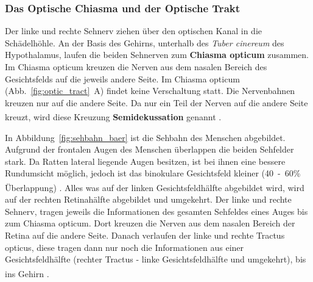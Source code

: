 \documentclass[12pt,a4paper,pdftex]{article}
\begin{document}
\subsubsection*{Das Optische Chiasma und der Optische Trakt}

Der linke und rechte Sehnerv ziehen über den optischen Kanal in die Schädelhöhle. An der Basis des Gehirns, unterhalb des \textit{Tuber cinereum} des Hypothalamus, laufen die beiden Sehnerven zum \textbf{Chiasma opticum}  zusammen. 
Im Chiasma opticum kreuzen die Nerven aus dem nasalen Bereich des Gesichtsfelds auf die jeweils andere Seite. Im Chiasma opticum (Abb.~\ref{fig:optic_tract}~A) findet keine Verschaltung statt. Die Nervenbahnen kreuzen nur auf die andere Seite.
Da nur ein Teil der Nerven auf die andere Seite kreuzt, wird diese Kreuzung \textbf{Semidekussation}  genannt \textsuperscript{\cite[15]{crossman2014neuroanatomy}}. 

In Abbildung~\ref{fig:sehbahn_baer} ist die Sehbahn des Menschen abgebildet. Aufgrund der frontalen Augen des Menschen überlappen die beiden Sehfelder stark. Da Ratten lateral liegende Augen besitzen, ist bei ihnen eine bessere Rundumsicht möglich, jedoch ist das binokulare Gesichtsfeld kleiner (40~-~60\% Überlappung) \textsuperscript{\cite[30]{paxinos2014rat}}.
Alles was auf der linken Gesichtsfeldhälfte abgebildet wird, wird auf der rechten Retinahälfte abgebildet und umgekehrt. Der linke und rechte Sehnerv, tragen jeweils die Informationen des gesamten Sehfeldes eines Auges bis zum Chiasma opticum. Dort kreuzen die Nerven aus dem nasalen Bereich der Retina auf die andere Seite. Danach verlaufen der linke und rechte Tractus opticus,  diese tragen dann nur noch die Informationen aus einer Gesichtsfeldhälfte (rechter Tractus - linke Gesichtsfeldhälfte und umgekehrt), bis ins Gehirn \textsuperscript{\cite[15]{crossman2014neuroanatomy}}.
\end{document}
